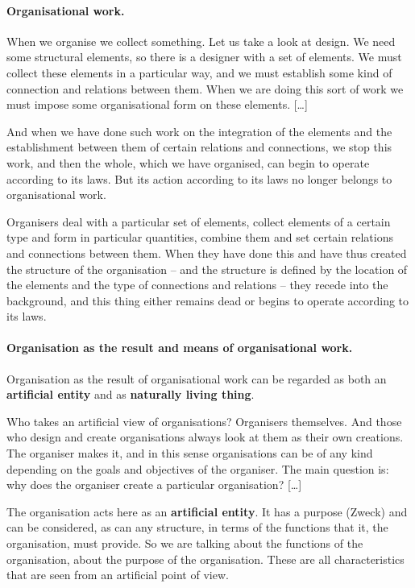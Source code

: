 \documentclass[11pt,a4paper]{article}
\begin{document}
\paragraph{Organisational work.}
\cite[p. 26]{MSM} When we organise we collect something. Let us take a look at
design. We need some structural elements, so there is a designer with a set of
elements. We must collect these elements in a particular way, and we must
establish some kind of connection and relations between them. When we are
doing this sort of work we must impose some organisational form on these
elements. [\ldots]

And when we have done such work on the integration of the elements and the
establishment between them of certain relations and connections, we stop this
work, and then the whole, which we have organised, can begin to operate
according to its laws. But its action according to its laws no longer belongs
to organisational work.

Organisers deal with a particular set of elements, collect elements of a
certain type and form in particular quantities, combine them and set certain
relations and connections between them. When they have done this and have thus
created the structure of the organisation – and the structure is defined by
the location of the elements and the type of connections and relations – they
recede into the background, and this thing either remains dead or begins to
operate according to its laws.

\paragraph{Organisation as the result and means of organisational work.}
\cite[p. 29]{MSM} Organisation as the result of organisational work can be
regarded as both an \textbf{artificial entity} and as \textbf{naturally living
  thing}.

Who takes an artificial view of organisations? Organisers themselves. And
those who design and create organisations always look at them as their own
creations.  The organiser makes it, and in this sense organisations can be of
any kind depending on the goals and objectives of the organiser. The main
question is: why does the organiser create a particular organisation?
[\ldots]

The organisation acts here as an \textbf{artificial entity}. It has a purpose
(Zweck) and can be considered, as can any structure, in terms of the functions
that it, the organisation, must provide. So we are talking about the functions
of the organisation, about the purpose of the organisation.  These are all
characteristics that are seen from an artificial point of view.
\end{document}

